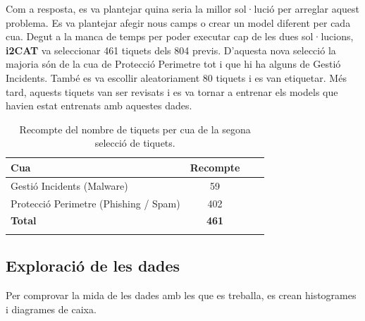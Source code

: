 Com a resposta, es va plantejar quina seria la millor sol·lució per arreglar aquest problema. Es va plantejar afegir nous camps o crear un model diferent per cada cua. Degut a la manca de temps per poder executar cap de les dues sol·lucions, \textbf{i2CAT} va seleccionar 461 tiquets dels 804 previs. D'aquesta nova selecció la majoria són de la cua de Protecció Perimetre tot i que hi ha alguns de Gestió Incidents. També es va escollir aleatoriament 80 tiquets i es van etiquetar. Més tard, aquests tiquets van ser revisats i es va tornar a entrenar els models que havien estat entrenats amb aquestes dades. 

\begin{table}[H]
  \centering
  \begin{tabular}{lccr}
      \Xhline{2\arrayrulewidth}
      \textbf{Cua} & \textbf{Recompte} \\
      \hline
      Gestió Incidents (Malware) & 59 \\
      Protecció Perimetre (Phishing / Spam) & 402  \\
      \hline
      \textbf{Total} & \textbf{461} \\
      \Xhline{2\arrayrulewidth}
  \end{tabular}
  \caption{Recompte del nombre de tiquets per cua de la segona selecció de tiquets.}
  \label{tab:recompte_per_cua_2}
\end{table}





\subsection{Exploració de les dades}
Per comprovar la mida de les dades amb les que es treballa, es crean histogrames i diagrames de caixa.

